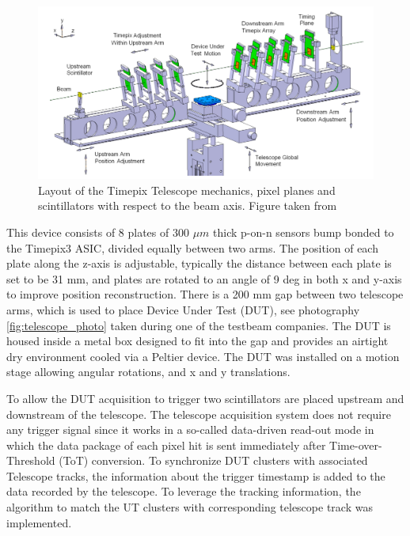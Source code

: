 \begin{figure}[!h]
\centering
\includegraphics{figures/telescope.png}
\caption{Layout of the Timepix Telescope mechanics, pixel planes and scintillators with respect to the beam axis. Figure taken from~\cite{telescope}}
\label{fig:telescope}
\end{figure}


This device consists of 8 plates of 300 $\mu m$ thick p-on-n sensors bump bonded to the Timepix3 ASIC, divided equally between two arms. The position of each plate along the z-axis is adjustable, typically the distance between each plate is set to be 31 mm, and plates are rotated to an angle of 9 deg in both x and y-axis to improve position reconstruction. There is a 200 mm gap between two telescope arms, which is used to place Device Under Test (DUT), see photography \ref{fig:telescope_photo} taken during one of the testbeam companies. The DUT is housed inside a metal box designed to fit into the gap and provides an airtight dry environment cooled via a Peltier device. 
The DUT was installed on a motion stage allowing angular rotations, and x and y translations. 

To allow the DUT acquisition to trigger two scintillators are placed upstream and downstream of the telescope. The telescope acquisition system does not require any trigger signal since it works in a so-called data-driven read-out mode in which the data package of each pixel hit is sent immediately after Time-over-Threshold (ToT) conversion. To synchronize DUT clusters with associated Telescope tracks, the information about the trigger timestamp is added to the data recorded by the telescope. To leverage the tracking information, the algorithm to match the UT clusters with corresponding telescope track was implemented. 


